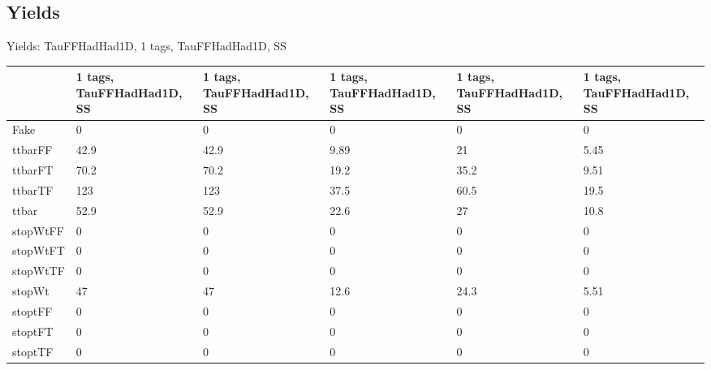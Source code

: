 
\subsection{Yields}

\begin{frame}{Yields: TauFFHadHad1D, 1 tags, TauFFHadHad1D, SS}
\begin{center}
  \begin{tabular}{l| >{\centering\let\newline\\\arraybackslash\hspace{0pt}}m{1.4cm}| >{\centering\let\newline\\\arraybackslash\hspace{0pt}}m{1.4cm}| >{\centering\let\newline\\\arraybackslash\hspace{0pt}}m{1.4cm}| >{\centering\let\newline\\\arraybackslash\hspace{0pt}}m{1.4cm}| >{\centering\let\newline\\\arraybackslash\hspace{0pt}}m{1.4cm}}
    & 1 tags, TauFFHadHad1D, SS & 1 tags, TauFFHadHad1D, SS & 1 tags, TauFFHadHad1D, SS & 1 tags, TauFFHadHad1D, SS & 1 tags, TauFFHadHad1D, SS \\
 \hline \hline
    Fake& 0 & 0 & 0 & 0 & 0 \\
 \hline
    ttbarFF& 42.9 & 42.9 & 9.89 & 21 & 5.45 \\
 \hline
    ttbarFT& 70.2 & 70.2 & 19.2 & 35.2 & 9.51 \\
 \hline
    ttbarTF& 123 & 123 & 37.5 & 60.5 & 19.5 \\
 \hline
    ttbar& 52.9 & 52.9 & 22.6 & 27 & 10.8 \\
 \hline
    stopWtFF& 0 & 0 & 0 & 0 & 0 \\
 \hline
    stopWtFT& 0 & 0 & 0 & 0 & 0 \\
 \hline
    stopWtTF& 0 & 0 & 0 & 0 & 0 \\
 \hline
    stopWt& 47 & 47 & 12.6 & 24.3 & 5.51 \\
 \hline
    stoptFF& 0 & 0 & 0 & 0 & 0 \\
 \hline
    stoptFT& 0 & 0 & 0 & 0 & 0 \\
 \hline
    stoptTF& 0 & 0 & 0 & 0 & 0 \\

\end{tabular}
\end{center}
\end{frame}
